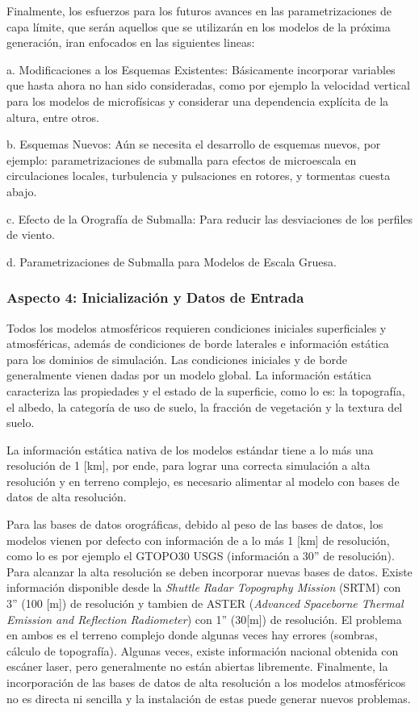 Finalmente, los esfuerzos para los futuros avances en las parametrizaciones de capa límite, que serán aquellos que se utilizarán en los modelos de la próxima generación, iran enfocados en las siguientes lineas:
\begin{enumerate*}
	\item[a.] Modificaciones a los Esquemas Existentes: Básicamente incorporar variables que hasta ahora no han sido consideradas, como por ejemplo la velocidad vertical para los modelos de microfísicas y considerar una dependencia explícita de la altura, entre otros.
	\item[b.] Esquemas Nuevos: Aún se necesita el desarrollo de esquemas nuevos, por ejemplo: parametrizaciones de submalla para efectos de microescala en circulaciones locales, turbulencia y pulsaciones en rotores, y tormentas cuesta abajo.
	\item[c.] Efecto de la Orografía de Submalla: Para reducir las desviaciones de los perfiles de viento.
	\item[d.] Parametrizaciones de Submalla para Modelos de Escala Gruesa.
\end{enumerate*}

\subsubsection{Aspecto 4: Inicialización y Datos de Entrada}
Todos los modelos atmosféricos requieren condiciones iniciales superficiales y atmosféricas, además de condiciones de borde laterales e información estática para los dominios de simulación. Las condiciones iniciales y de borde generalmente vienen dadas por un modelo global. La información estática caracteriza las propiedades y el estado de la superficie, como lo es: la topografía, el albedo, la categoría de uso de suelo, la fracción de vegetación y la textura del suelo.

La información estática nativa de los modelos estándar tiene a lo más una resolución de 1 [km], por ende, para lograr una correcta simulación a alta resolución y en terreno complejo, es necesario alimentar al modelo con bases de datos de alta resolución.

Para las bases de datos orográficas, debido al peso de las bases de datos, los modelos vienen por defecto con información de a lo más 1 [km] de resolución, como lo es por ejemplo el GTOPO30 USGS (información a 30'' de resolución). Para alcanzar la alta resolución se deben incorporar nuevas bases de datos. Existe información disponible desde la \emph{Shuttle Radar Topography Mission} (SRTM) con 3'' (100 [m]) de resolución y tambien de ASTER (\emph{Advanced Spaceborne Thermal Emission and Reflection Radiometer}) con 1'' (30[m]) de resolución. El problema en ambos es el terreno complejo donde algunas veces hay errores (sombras, cálculo de topografía). Algunas veces, existe información nacional obtenida con escáner laser, pero generalmente no están abiertas libremente. Finalmente, la incorporación de las bases de datos de alta resolución a los modelos atmosféricos no es directa ni sencilla y la instalación de estas puede generar nuevos problemas.

